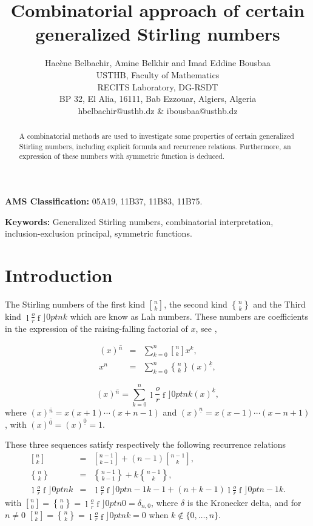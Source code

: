 \documentclass{article}
\newcommand {\stirlingf}[2]{\genfrac[]{0pt}{}{#1}{#2}}
\newcommand {\stirlings}[2]{\genfrac\{\}{0pt}{}{#1}{#2}}
\newcommand {\lah}[2]{\genfrac\lfloor \rfloor{0pt}{}{#1}{#2}}
\begin{document}
\title{Combinatorial approach of certain generalized Stirling numbers}
\author{Hac\`{e}ne Belbachir, Amine Belkhir and Imad Eddine Bousbaa  \\
USTHB, Faculty of Mathematics\\
RECITS Laboratory, DG-RSDT\\
BP 32, El Alia, 16111, Bab Ezzouar, Algiers, Algeria\\
hbelbachir@usthb.dz \& ibousbaa@usthb.dz}
\maketitle
\date{}
\begin{abstract}
A combinatorial methods are used to investigate some properties of certain
generalized Stirling numbers, including explicit formula and recurrence
relations. Furthermore, an expression of these numbers with symmetric
function is deduced.
\end{abstract}

\textbf{AMS Classification: }05A19, 11B37, 11B83, 11B75.

\textbf{Keywords: }Generalized Stirling numbers, combinatorial interpretation, inclusion-exclusion principal, symmetric functions.

\section{Introduction}

The Stirling numbers of the first kind $\stirlingf{n}{k}$, the second kind $%
\stirlings{n}{k}$ and the Third kind $\lah{n}{k}$ which are know as Lah numbers. These numbers are coefficients in the
expression of the raising-falling factorial of $x$, see \cite[pp 204]%
{MR1999993},

\begin{eqnarray}
\left( x\right) \overline{^{n}} &=&\sum_{k=0}^{n}\stirlingf{n}{k}x^{k}, \\
x^{n} &=&\sum_{k=0}^{n}\stirlings{n}{k}(x)^{\underline{k}},
\end{eqnarray}

\begin{equation*}
\left( x\right) \overline{^{n}} =\sum_{k=0}^{n}\lah{n}{k}(x)^{\underline{k}},
\end{equation*}
where $\left( x\right) \overline{^{n}}=x(x+1)\cdots (x+n-1)$ and $(x)^{\underline{n}}=x(x-1)\cdots (x-n+1)$, with $\left( x\right) \overline{^{0}}=(x)^{\underline{0}}=1$.


These three sequences satisfy respectively the following recurrence relations%
\begin{eqnarray}
\stirlingf{n}{k} &=&\stirlingf{n-1}{k-1}+\left( n-1\right) \stirlingf{n-1}{k},  \label{recS1} \\
\stirlings{n}{k} &=&\stirlings{n-1}{k-1}+k\stirlings{n-1}{k},  \label{recS22} \\
\lah{n}{k} &=&\lah{n-1}{k-1}+\left(n+k-1\right) \lah{n-1}{k}.  \label{recLah}
\end{eqnarray}%
with $\stirlingf{n}{0}=\stirlings{n}{0}=\lah{n}{0}=\delta _{n,0}$, where $\delta $ is the Kronecker delta, and for $n\neq 0$ $\stirlingf{n}{k}=\stirlings{n}{k}=\lah{n}{k}=0$ when $k\notin \{0,\ldots,n\}$.
\end{document}
